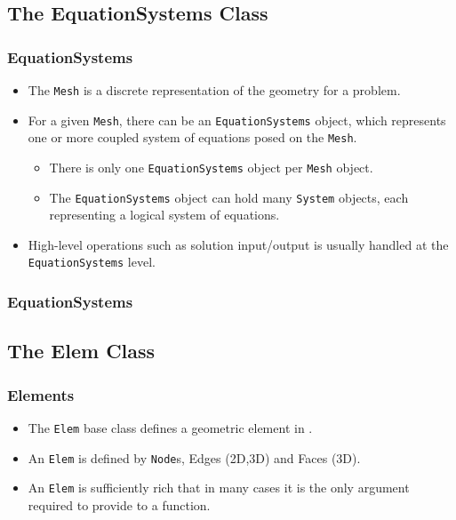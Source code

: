 \subsection{The EquationSystems Class}
\begin{frame}
  \frametitle{EquationSystems}
  \begin{block}{}
    \begin{itemize}
      \item The \texttt{Mesh} is a discrete representation of the geometry for a problem.
      \item For a given \texttt{Mesh}, there can be an \texttt{EquationSystems} object, which represents one or more coupled system of equations posed on the \texttt{Mesh}.
        \begin{itemize}
          \item There is only one \texttt{EquationSystems} object per \texttt{Mesh} object.
          \item The \texttt{EquationSystems} object can hold many \texttt{System} objects, each representing a logical system of equations.
        \end{itemize}
      \item High-level operations such as solution input/output is usually handled at the \texttt{EquationSystems} level.
    \end{itemize}
  \end{block}
\end{frame}

\begin{frame}[shrink]
  \frametitle{EquationSystems}
  
\end{frame}




\subsection{The Elem Class}
\begin{frame}
  \frametitle{Elements}
  \begin{block}{}
    \begin{itemize}
      \item The \texttt{Elem} base class defines a geometric element in \libMesh{}.
      \item An \texttt{Elem} is defined by \texttt{Node}s, Edges (2D,3D) and Faces (3D).
      \item An \texttt{Elem} is sufficiently rich that in many cases it is the only argument required to provide to a function.
    \end{itemize}
  \end{block}
\end{frame}

